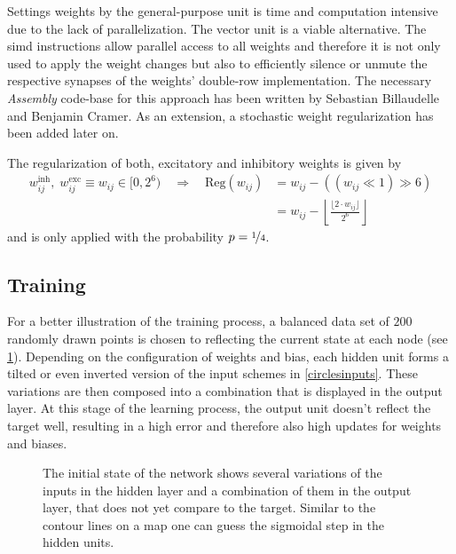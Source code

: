Settings weights by the general-purpose unit is time and computation intensive due to the lack of parallelization. The vector unit is a viable alternative. The \gls{simd} instructions allow parallel access to all weights and therefore it is not only used to apply the weight changes but also to efficiently silence or unmute the respective synapses of the weights' double-row implementation. The necessary \emph{Assembly} code-base for this approach has been written by Sebastian Billaudelle and Benjamin Cramer. As an extension, a stochastic weight regularization has been added later on.

The regularization of both, excitatory and inhibitory weights is given by
\begin{align}
w_{ij}^\text{inh},\; w_{ij}^\text{exc}\equiv w_{ij} \in [0,2^6) \quad  \Rightarrow \quad \text{Reg}(w_{ij}) &= w_{ij} - \left(\left(w_{ij} \ll 1\right) \gg 6\right) \nonumber \\
								&= w_{ij} - \left\lfloor \frac{\lfloor 2 \cdot w_{ij}  \rfloor}{2^{6}} \right\rfloor								
\end{align}
and is only applied with the probability $p=\nicefrac{1}{4}$.

\subsection{Training}
For a better illustration of the training process, a balanced data set of $200$ randomly drawn points is chosen to reflecting the current state at each node (see \cref{learning_process_s5}). Depending on the configuration of weights and bias, each hidden unit forms a tilted or even inverted version of the input schemes in \cref{circlesinputs}. These variations are then composed into a combination that is displayed in the output layer. At this stage of the learning process, the output unit doesn't reflect the target well, resulting in a high error and therefore also high updates for weights and biases.
\begin{figure}
	\label{learning_process_s5}
	
	\caption{The initial state of the network shows several variations of the inputs in the hidden layer and a combination of them in the output layer, that does not yet compare to the target. Similar to the contour lines on a map one can guess the sigmoidal step in the hidden units. }
\end{figure}

